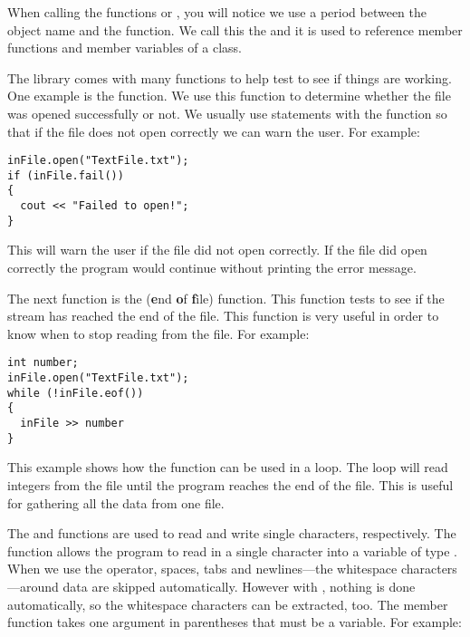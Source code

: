 When calling the functions  or , you will notice we use a period between the object name and the function. 
We call this the  and it is used to reference member functions and member variables of a class. 


The  library comes with many functions to help test to see if things are working. 
One example is the  function. 
We use this function to determine whether the file was opened successfully or not. 
We usually use  statements with the function so that if the file does not open correctly we can warn the user. 
For example:

\noindent\begin{minipage}{\linewidth}\begin{lstlisting}
inFile.open("TextFile.txt");
if (inFile.fail())
{ 
  cout << "Failed to open!";
}
\end{lstlisting}\end{minipage}

This will warn the user if the file did not open correctly. 
If the file did open correctly the program would continue without printing the error message.

The next function is the  (\textbf{e}nd \textbf{o}f \textbf{f}ile) function. 
This function tests to see if the stream has reached the end of the file. 
This function is very useful in order to know when to stop reading from the file. 
For example:

\noindent\begin{minipage}{\linewidth}\begin{lstlisting}
int number;
inFile.open("TextFile.txt");
while (!inFile.eof())
{
  inFile >> number
}
\end{lstlisting}\end{minipage}

This example shows how the  function can be used in a  loop. 
The  loop will read integers from the file until the program reaches the end of the file. 
This is useful for gathering all the data from one file. 

The  and  functions are used to read and write single characters, respectively. 
The function  allows the program to read in a single character into a variable of type . 
When we use the \Code{>>} operator, spaces, tabs and newlines---the whitespace characters---around data are skipped automatically. 
However with , nothing is done automatically, so the whitespace characters can be extracted, too. 
The member function  takes one argument in parentheses that must be a  variable. 
For example:

